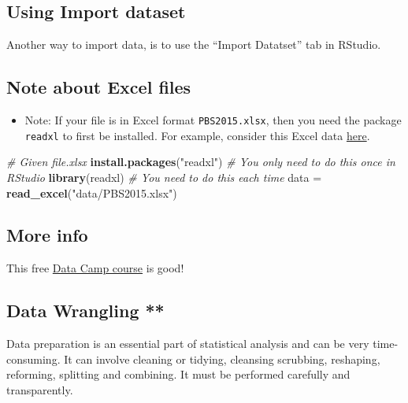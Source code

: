 \documentclass[]{article}
\newenvironment{Shaded}{\begin{snugshade}}{\end{snugshade}}
\newcommand{\CommentTok}[1]{\textcolor[rgb]{0.56,0.35,0.01}{\textit{#1}}}
\newcommand{\KeywordTok}[1]{\textcolor[rgb]{0.13,0.29,0.53}{\textbf{#1}}}
\newcommand{\NormalTok}[1]{#1}
\newcommand{\StringTok}[1]{\textcolor[rgb]{0.31,0.60,0.02}{#1}}
\providecommand{\tightlist}{%
  \setlength{\itemsep}{0pt}\setlength{\parskip}{0pt}}
\begin{document}
\hypertarget{using-import-dataset}{%
\subsection{Using Import dataset}\label{using-import-dataset}}

Another way to import data, is to use the ``Import Datatset'' tab in RStudio.

\hypertarget{note-about-excel-files}{%
\subsection{Note about Excel files}\label{note-about-excel-files}}

\begin{itemize}
\tightlist
\item
  Note: If your file is in Excel format \texttt{PBS2015.xlsx}, then you need the package \texttt{readxl} to first be installed. For example, consider this Excel data \href{http://www.maths.usyd.edu.au/u/UG/JM/DATA1001/r/current/data/PBS2015.xlsx}{here}.
\end{itemize}

\begin{Shaded}
\begin{Highlighting}[]
\CommentTok{# Given file.xlsx}
\KeywordTok{install.packages}\NormalTok{(}\StringTok{"readxl"}\NormalTok{)  }\CommentTok{# You only need to do this once in RStudio}
\KeywordTok{library}\NormalTok{(readxl)  }\CommentTok{# You need to do this each time}
\NormalTok{data =}\StringTok{ }\KeywordTok{read_excel}\NormalTok{(}\StringTok{"data/PBS2015.xlsx"}\NormalTok{)}
\end{Highlighting}
\end{Shaded}

\hypertarget{more-info}{%
\subsection{More info}\label{more-info}}

This free \href{https://learn.datacamp.com/courses/introduction-to-importing-data-in-r}{Data Camp course} is good!

\hypertarget{data-wrangling}{%
\subsection{Data Wrangling **}\label{data-wrangling}}

Data preparation is an essential part of statistical analysis and can be very time-consuming. It can involve cleaning or tidying, cleansing scrubbing, reshaping, reforming, splitting and combining. It must be performed carefully and transparently.
\end{document}
